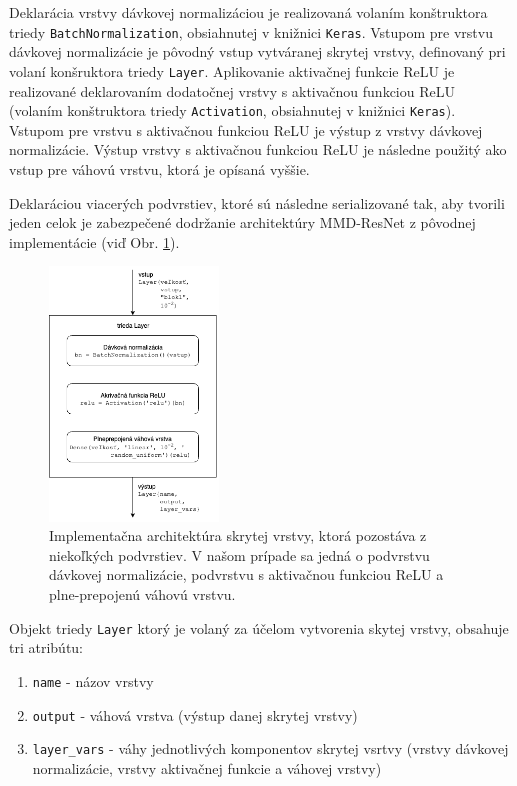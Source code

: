 Deklarácia vrstvy dávkovej normalizáciou je realizovaná volaním konštruktora triedy \texttt{BatchNormalization}, obsiahnutej v knižnici \texttt{Keras}. Vstupom pre vrstvu dávkovej normalizácie je pôvodný vstup vytváranej skrytej vrstvy, definovaný pri volaní konšruktora triedy \texttt{Layer}. Aplikovanie aktivačnej funkcie ReLU je realizované deklarovaním dodatočnej vrstvy s aktivačnou funkciou ReLU (volaním konštruktora triedy \texttt{Activation}, obsiahnutej v knižnici \texttt{Keras}). Vstupom pre vrstvu s aktivačnou funkciou ReLU je výstup z vrstvy dávkovej normalizácie. Výstup vrstvy s aktivačnou funkciou ReLU je následne použitý ako vstup pre váhovú vrstvu, ktorá je opísaná vyššie. 

Deklaráciou viacerých podvrstiev, ktoré sú následne serializované tak, aby tvorili jeden celok je zabezpečené dodržanie architektúry MMD-ResNet z pôvodnej implementácie (viď Obr. \ref{impl_vrstva}).

\begin{figure}
\centerline{\includegraphics[width=0.4\textwidth]{images/skryta_vrstva.png}}
\caption[Implementačna architektúra skrytej vrstvy]{Implementačna architektúra skrytej vrstvy, ktorá pozostáva z niekoľkých podvrstiev. V našom prípade sa jedná o podvrstvu dávkovej normalizácie, podvrstvu s aktivačnou funkciou ReLU a plne-prepojenú váhovú vrstvu.}
\label{impl_vrstva}
\end{figure}

Objekt triedy \texttt{Layer} ktorý je volaný za účelom vytvorenia skytej vrstvy, obsahuje tri atribútu:
\begin{enumerate}
    \item \texttt{name} - názov vrstvy
    \item \texttt{output} - váhová vrstva (výstup danej skrytej vrstvy)
    \item \texttt{layer_vars} - váhy jednotlivých komponentov skrytej vsrtvy (vrstvy dávkovej normalizácie, vrstvy aktivačnej funkcie a váhovej vrstvy)
\end{enumerate}

